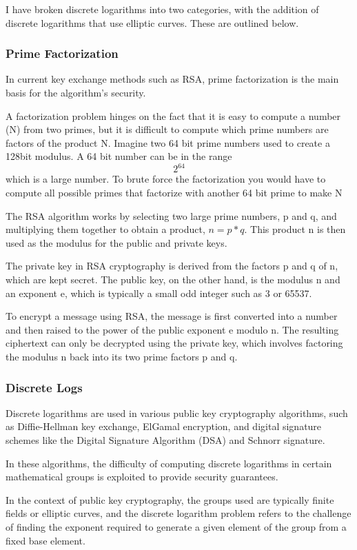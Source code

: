 \documentclass{article}
\begin{document}
I have broken discrete logarithms into two categories, with the addition of discrete logarithms that use elliptic curves. These are outlined below.

\subsubsection{Prime Factorization}

In current key exchange methods such as RSA, prime factorization is the main basis for the algorithm's security. 

A factorization problem hinges on the fact that it is easy to compute a number (N) from two primes, but it is difficult to compute which prime numbers are factors of the product N. Imagine two 64 bit prime numbers used to create a 128bit modulus. A 64 bit number can be in the range \[2^{64}\] which is a large number. To brute force the factorization you would have to compute all possible primes that factorize with another 64 bit prime to make N

The RSA algorithm works by selecting two large prime numbers, p and q, and multiplying them together to obtain a product, $n = p*q$. This product n is then used as the modulus for the public and private keys.

The private key in RSA cryptography is derived from the factors p and q of n, which are kept secret. The public key, on the other hand, is the modulus n and an exponent e, which is typically a small odd integer such as 3 or 65537.

To encrypt a message using RSA, the message is first converted into a number and then raised to the power of the public exponent e modulo n. The resulting ciphertext can only be decrypted using the private key, which involves factoring the modulus n back into its two prime factors p and q.

\subsubsection{Discrete Logs}
Discrete logarithms are used in various public key cryptography algorithms, such as Diffie-Hellman key exchange, ElGamal encryption, and digital signature schemes like the Digital Signature Algorithm (DSA) and Schnorr signature.

In these algorithms, the difficulty of computing discrete logarithms in certain mathematical groups is exploited to provide security guarantees.

In the context of public key cryptography, the groups used are typically finite fields or elliptic curves, and the discrete logarithm problem refers to the challenge of finding the exponent required to generate a given element of the group from a fixed base element.
\end{document}
